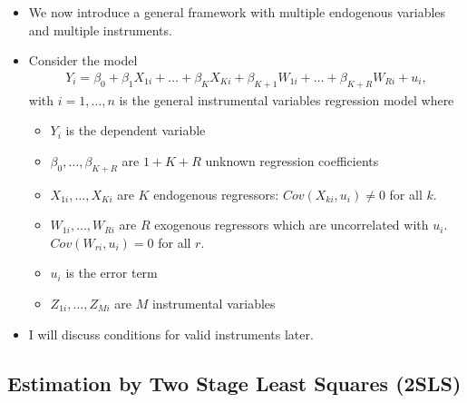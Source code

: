 \documentclass[]{book}
\providecommand{\tightlist}{%
  \setlength{\itemsep}{0pt}\setlength{\parskip}{0pt}}
\begin{document}
\begin{itemize}
\tightlist
\item
  We now introduce a general framework with multiple endogenous
  variables and multiple instruments.
\item
  Consider the model \[
  \begin{aligned}
    Y_i = \beta_0 + \beta_1 X_{1i} + \dots + \beta_K X_{Ki} + \beta_{K+1} W_{1i} + \dots + \beta_{K+R} W_{Ri} + u_i, 
  \end{aligned}
  \] with \(i=1,\dots,n\) is the general instrumental variables
  regression model where

  \begin{itemize}
  \tightlist
  \item
    \(Y_i\) is the dependent variable
  \item
    \(\beta_0,\dots,\beta_{K+R}\) are \(1+K+R\) unknown regression
    coefficients
  \item
    \(X_{1i},\dots,X_{Ki}\) are \(K\) endogenous regressors:
    \(Cov(X_{ki}, u_i) \neq 0\) for all \(k\).
  \item
    \(W_{1i},\dots,W_{Ri}\) are \(R\) exogenous regressors which are
    uncorrelated with \(u_i\). \(Cov(W_{ri}, u_i) = 0\) for all \(r\).
  \item
    \(u_i\) is the error term
  \item
    \(Z_{1i},\dots,Z_{Mi}\) are \(M\) instrumental variables
  \end{itemize}
\item
  I will discuss conditions for valid instruments later.
\end{itemize}

\subsection{Estimation by Two Stage Least Squares
(2SLS)}\label{estimation-by-two-stage-least-squares-2sls}
\end{document}
